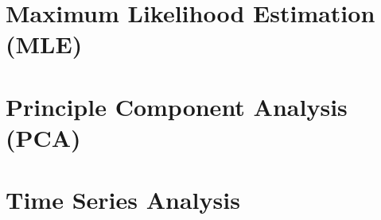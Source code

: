 \section{Maximum Likelihood Estimation (MLE)}
\label{stats:MLE}


\section{Principle Component Analysis (PCA)}
\label{stats:PCA}

\section{Time Series Analysis}
\label{stats:time_series_ana}

